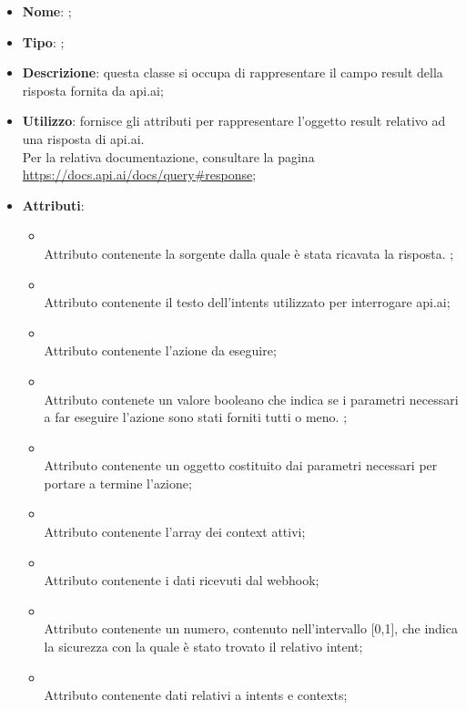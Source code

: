 \begin{itemize}
	\item \textbf{Nome}: ;
	\item \textbf{Tipo}: ;
	\item \textbf{Descrizione}: questa classe si occupa di rappresentare il campo result della risposta fornita da api.ai;
	\item \textbf{Utilizzo}: fornisce gli attributi per rappresentare l'oggetto result relativo ad una risposta di api.ai. \\
Per la relativa documentazione, consultare la pagina \url{https://docs.api.ai/docs/query#response};
	\item \textbf{Attributi}:
	\begin{itemize}
		\item[]  \\
		Attributo contenente la sorgente dalla quale è stata ricavata la risposta. ;
		\item[]  \\
		Attributo contenente il testo dell'intents utilizzato per interrogare api.ai;
		\item[]  \\
		Attributo contenente l'azione da eseguire;
		\item[]  \\
		Attributo contenete un valore booleano che indica se i parametri necessari a far eseguire l'azione sono stati forniti tutti o meno. ;
		\item[]  \\
		Attributo contenente un oggetto costituito dai parametri necessari per portare a termine l'azione;
		\item[]  \\
		Attributo contenente l'array dei context attivi;
		\item[]  \\
		Attributo contenente i dati ricevuti dal webhook;
		\item[]  \\
		Attributo contenente un numero, contenuto nell'intervallo [0,1], che indica la sicurezza con  la quale è stato trovato il relativo intent;
		\item[]  \\
		Attributo contenente dati relativi a intents e contexts;
	\end{itemize}
\end{itemize}
\FloatBarrier

